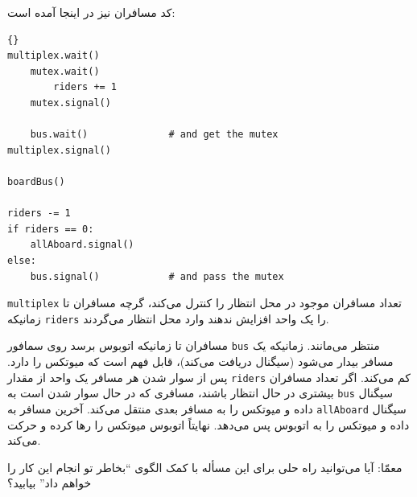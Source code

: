 \documentclass{book}
\newcommand{\clearemptydoublepage}{\newpage\cleardoublepage}
\begin{document}
    کد مسافران نیز در اینجا آمده است:

\begin{latin}
\begin{lstlisting}[title=\rl{راه حل مسأله اتوبوس (مسافران)}]{}
multiplex.wait()
    mutex.wait()
        riders += 1
    mutex.signal()

    bus.wait()              # and get the mutex
multiplex.signal()

boardBus()

riders -= 1
if riders == 0:
    allAboard.signal() 
else:
    bus.signal()            # and pass the mutex
\end{lstlisting}
\end{latin}

    {\tt multiplex}
    تعداد مسافران موجود در محل انتظار را کنترل می‌کند، گرچه مسافران تا زمانیکه {\tt riders} را یک واحد افزایش ندهند وارد محل انتظار می‌گردند. 
    

    مسافران تا زمانیکه اتوبوس برسد روی سمافور  {\tt bus} منتظر می‌‌مانند. زمانیکه یک مسافر بیدار می‌شود (سیگنال دریافت می‌کند)، قابل فهم است که 
    میوتکس را دارد. پس از سوار شدن هر مسافر یک واحد از مقدار  {\tt riders} کم می‌کند. اگر تعداد مسافران بیشتری در حال انتظار باشند، 
    مسافری که در حال سوار شدن است به  {\tt bus} سیگنال داده و میوتکس را به مسافر بعدی منتقل می‌کند. 
    آخرین مسافر به {\tt allAboard} سیگنال داده و میوتکس را به اتوبوس پس می‌دهد. 
    نهایتاً اتوبوس میوتکس را رها کرده و حرکت می‌کند. 

    معمّا: آیا می‌توانید راه حلی برای این مسأله با کمک الگوی ``بخاطر تو انجام این کار را خواهم داد'' بیابید؟


\clearemptydoublepage
\end{document}
